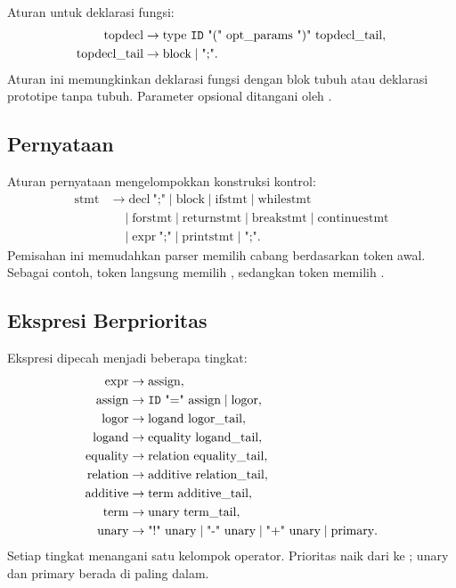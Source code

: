 Aturan untuk deklarasi fungsi:
\[
\begin{aligned}
\text{topdecl} &\to \text{type}\ \texttt{ID}\ \text{"("}\
\text{opt\_params}\ \text{")"}\ \text{topdecl\_tail},\\
\text{topdecl\_tail} &\to \text{block} \mid \text{";"}.
\end{aligned}
\]
Aturan ini memungkinkan deklarasi fungsi dengan blok tubuh atau
deklarasi prototipe tanpa tubuh. Parameter opsional ditangani oleh
\code{opt\_params}.

\subsection{Pernyataan}

Aturan pernyataan mengelompokkan konstruksi kontrol:
\[
\begin{aligned}
\text{stmt} &\to \text{decl}\ \text{";"} \mid \text{block}
\mid \text{ifstmt} \mid \text{whilestmt}\\
&\quad \mid \text{forstmt} \mid \text{returnstmt}
\mid \text{breakstmt} \mid \text{continuestmt}\\
&\quad \mid \text{expr}\ \text{";"} \mid \text{printstmt}
\mid \text{";"}.
\end{aligned}
\]
Pemisahan ini memudahkan parser memilih cabang berdasarkan token
awal. Sebagai contoh, token \code{if} langsung memilih
, sedangkan token  memilih
.

\subsection{Ekspresi Berprioritas}

Ekspresi dipecah menjadi beberapa tingkat:
\[
\begin{aligned}
\text{expr} &\to \text{assign},\\
\text{assign} &\to \texttt{ID}\ \text{"="}\ \text{assign}
\mid \text{logor},\\
\text{logor} &\to \text{logand}\ \text{logor\_tail},\\
\text{logand} &\to \text{equality}\ \text{logand\_tail},\\
\text{equality} &\to \text{relation}\ \text{equality\_tail},\\
\text{relation} &\to \text{additive}\ \text{relation\_tail},\\
\text{additive} &\to \text{term}\ \text{additive\_tail},\\
\text{term} &\to \text{unary}\ \text{term\_tail},\\
\text{unary} &\to \text{"!"}\ \text{unary}
\mid \text{"-"}\ \text{unary}
\mid \text{"+"}\ \text{unary} \mid \text{primary}.
\end{aligned}
\]
Setiap tingkat menangani satu kelompok operator. Prioritas naik dari
\code{logor} ke \code{term}; unary dan primary berada di paling
dalam.

